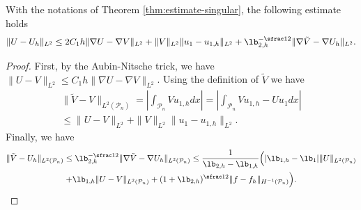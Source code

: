 \begin{thm}\label{thm:estimate-singular-L2}
With the notations of Theorem \ref{thm:estimate-singular}, the following estimate holds
\[
\|U-U_{h}\|_{L^2}\le 2C_1h \|\nabla U-\nabla V\|_{L^2} + \|V\|_{L^2}\|u_1-u_{1,h}\|_{L^2}+ \lb_{2,h}^{-\sfrac 12} \| \nabla \tilde V-\nabla U_h\|_{L^2}.
\]
\end{thm}
\begin{proof}
First, by the Aubin-Nitsche trick, we have $\|U-V\|_{L^2}\le C_1h \|\nabla U-\nabla V\|_{L^2}$.
Using the definition of $\tilde V$ we have
\vspace*{-5pt}
\begin{multline*}
\|\tilde V-V\|_{L^2(\mathcal P_n)} = \left|\int_{\mathcal P_n} Vu_{1,h} dx\right| = \left|\int_{\mathcal P_n} Vu_{1,h}-U u_1 dx\right|\\
\le \|U-V\|_{L^2}+ \|V\|_{L^2}\|u_1-u_{1,h}\|_{L^2}.
\end{multline*}
Finally, we have
\vspace*{-5pt}
\begin{multline*} \|\tilde V-U_h\|_{L^2(\mathcal P_n)} \le \lb_{2,h}^{-\sfrac 12} \| \nabla \tilde V-\nabla U_h\|_{L^2(\mathcal P_n)}
\le \frac{1}{\lb_{2,h}-\lb_{1,h}} \Big (|\lb_{1,h}-\lb_1| \|U\|_{L^2(\mathcal P_n)}\\
+ \lb_{1,h}\|U-V\|_{L^2(\mathcal P_n)}+ (1+ \lb_{2,h})^{\sfrac 12}\|f-f_h\|_{H^{-1} (\mathcal P_n)}\Big).\qedhere
\end{multline*}
\end{proof}

